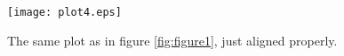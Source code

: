\begin{figure}[H]
    \vspace{-5mm}
    \begin{center}
        \texttt{[image: plot4.eps]}
    \end{center}
    \vspace{-15mm}
    \caption{The same plot as in figure \ref{fig:figure1}, just aligned properly.}
    \label{fig:figure2}
\end{figure}
